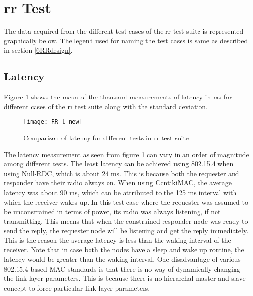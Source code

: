 \section{\texorpdfstring{\acrlong{rr}}{Request-Response} Test}
The data acquired from the different test cases of the \gls{rr} test suite is represented graphically below. The legend used for naming the test cases is same as described in section \ref{6RRdesign}.

\subsection{Latency}

Figure \ref{fig:RR-l} shows the mean of the thousand measurements of latency in ms for different cases of the \gls{rr} test suite along with the standard deviation. 

\begin{figure}[htb]
\texttt{[image: RR-l-new]}
\caption{Comparison of latency for different tests in \gls{rr} test suite}
\label{fig:RR-l}
\end{figure}

The latency measurement as seen from figure \ref{fig:RR-l} can vary in an order of magnitude among different tests. The least latency can be achieved using 802.15.4 when using Null-RDC, which is about 24 ms. This is because both the requester and responder have their radio always on. When using ContikiMAC, the average latency was about 90 ms, which can be attributed to the 125 ms interval with which the receiver wakes up. In this test case where the requester was assumed to be unconstrained in terms of power, its radio was always listening, if not transmitting. This means that when the constrained responder node was ready to send the reply, the requester node will be listening and get the reply immediately. This is the reason the average latency is less than the waking interval of the receiver. Note that in case both the nodes have a sleep and wake up routine, the latency would be greater than the waking interval. One disadvantage of various 802.15.4 based MAC standards is that there is no way of dynamically changing the link layer parameters. This is because there is no hierarchal master and slave concept to force particular link layer parameters.

